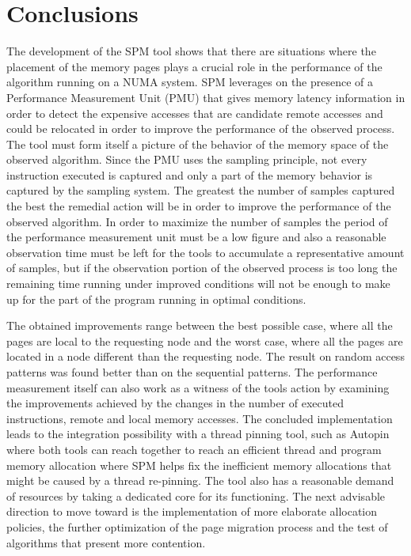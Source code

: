 \chapter[Conclusions and Possibilities of Future Work]{Conclusions}\label{chapter:conclusions}

The development of the SPM tool shows that there are situations where the placement of the memory pages plays a crucial role in the performance of the algorithm running on a NUMA system. SPM leverages on the presence of a Performance Measurement Unit (PMU) that gives memory latency information in order to detect the expensive accesses that are candidate remote accesses and could be relocated in order to improve the performance of the observed process.
The tool must form itself a picture of the behavior of the memory space of the observed algorithm. Since the PMU uses the sampling principle, not every instruction executed is captured and only a part of the memory behavior is captured by the sampling system. The greatest the number of samples captured the best the remedial action will be in order to improve the performance of the observed algorithm. In order to maximize the number of samples the period of the performance measurement unit must be a low figure and also a reasonable observation time must be left for the tools to accumulate a representative amount of samples, but if the observation portion of the observed process is too long the remaining time running under improved conditions will not be enough to make up for the part of the program running in optimal conditions.

The obtained improvements range between the best possible case, where all the pages are local to the requesting node and the worst case, where all the pages are located in a node different than the requesting node. The result on random access patterns was found better than on the sequential patterns. The performance measurement itself can also work as a witness of the tools action by examining the improvements achieved by the changes in the number of executed instructions, remote and local memory accesses.
The concluded implementation leads to the integration possibility with a thread pinning tool, such as Autopin where both tools can reach together to reach an efficient thread and program memory allocation where SPM helps fix the inefficient memory allocations that might be caused by a thread re-pinning. The tool also has a reasonable demand of resources by taking a dedicated core for its functioning.
The next advisable direction to move toward is the implementation of more elaborate allocation policies, the further optimization of the page migration process and the test of algorithms that present more contention.
